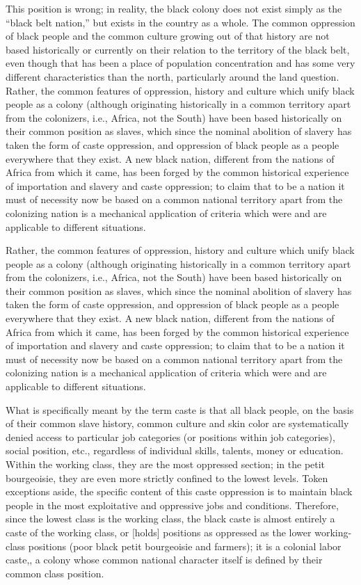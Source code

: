 \documentclass[12pt, titlepage]{article}
\begin{document}
{\begin{spacing}{1.10}
This position is wrong; in reality, the black colony does not exist simply as the ``black belt nation,'' but exists in the country as a whole. The common oppression of black people and the common culture growing out of that history are not based historically or currently on their relation to the territory of the black belt, even though that has been a place of population concentration and has some very different characteristics than the north, particularly around the land question. Rather, the common features of oppression, history and culture which unify black people as a colony (although originating historically in a common territory apart from the colonizers, i.e., Africa, not the South) have been based historically on their common position as slaves, which since the nominal abolition of slavery has taken the form of caste oppression, and oppression of black people as a people everywhere that they exist. A new black nation, different from the nations of Africa from which it came, has been forged by the common historical experience of importation and slavery and caste oppression; to claim that to be a nation it must of necessity now be based on a common national territory apart from the colonizing nation is a mechanical application of criteria which were and are applicable to different situations.

Rather, the common features of oppression, history and culture which unify black people as a colony (although originating historically in a common territory apart from the colonizers, i.e., Africa, not the South) have been based historically on their common position as slaves, which since the nominal abolition of slavery has taken the form of caste oppression, and oppression of black people as a people everywhere that they exist. A new black nation, different from the nations of Africa from which it came, has been forged by the common historical experience of importation and slavery and caste oppression; to claim that to be a nation it must of necessity now be based on a common national territory apart from the colonizing nation is a mechanical application of criteria which were and are applicable to different situations.

What is specifically meant by the term caste is that all black people, on the basis of their common slave history, common culture and skin color are systematically denied access to particular job categories (or positions within job categories), social position, etc., regardless of individual skills, talents, money or education. Within the working class, they are the most oppressed section; in the petit bourgeoisie, they are even more strictly confined to the lowest levels. Token exceptions aside, the specific content of this caste oppression is to maintain black people in the most exploitative and oppressive jobs and conditions. Therefore, since the lowest class is the working class, the black caste is almost entirely a caste of the working class, or [holds] positions as oppressed as the lower working-class positions (poor black petit bourgeoisie and farmers); it is a colonial labor caste,, a colony whose common national character itself is defined by their common class position.


\end{spacing}}
\end{document}
